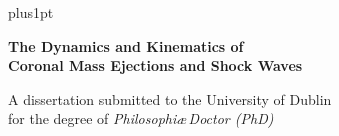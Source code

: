 \documentclass[a4paper, twoside, 12pt]{Latex/Classes/PhDthesisPSnPDF}
\begin{document}

\renewcommand\baselinestretch{1.2}
\baselineskip=18pt plus1pt


\newcommand{\titlefont}{\bfseries \fontsize{22}{26.42pt}\selectfont}
\newcommand{\largetitlefont}{\bfseries \fontsize{29.88}{35.88pt}\selectfont}
\newcommand{\othertitlefont}{\fontsize{14.4}{17.28}\selectfont}
\newcommand{\authorfont}{\bfseries \fontsize{14.4}{17.28}\selectfont}
\newcommand{\informationfont}{\fontsize{10}{12}\selectfont}
\newcommand{\dedicationfont}{\slshape \fontsize{14.4}{17.28}\selectfont}

\newcommand{\thisyear}{\number\year}
\def\thismonth{\ifcase\month\or January\or February\or March\or
  April\or May\or June\or July\or August\or September\or October\or November\or December\fi}
\newcommand{\todaysdate}{\thismonth\space \thisyear}

\renewcommand{\baselinestretch}{1}
\newpage \thispagestyle{empty}
\vspace*{1.5cm}
\begin{flushright}



\Huge{\textbf{The Dynamics and Kinematics of \\ Coronal Mass Ejections and Shock Waves}}

\end{flushright}

\vspace*{4cm}
\begin{flushright}
	A dissertation submitted to the University of Dublin \\
	for the degree of \emph{Philosophi\ae\,Doctor (PhD)} %
\end{flushright}
\end{document}
